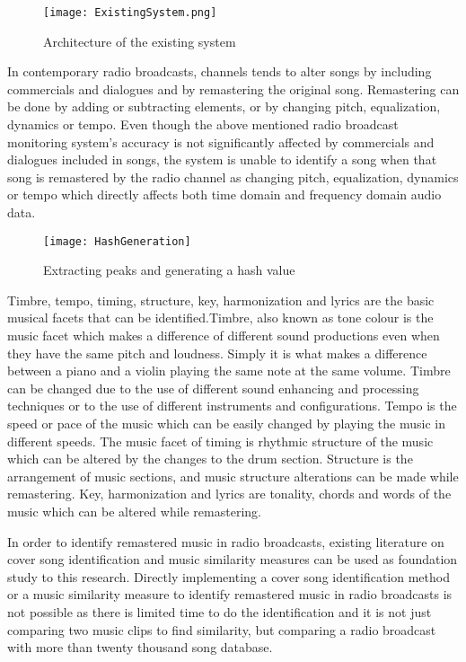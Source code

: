 \vspace{12pt}

\begin{figure}[H]
    \centering
    \texttt{[image: ExistingSystem.png]}
    \caption{Architecture of the existing system}
    \label{fig:existing_system}
\end{figure}
\vspace{12pt}

In contemporary radio broadcasts, channels tends to alter songs by including commercials and dialogues and by remastering 
the original song. Remastering can be done by adding or subtracting elements, or by changing pitch, equalization, dynamics or 
tempo\cite{SerraBook}. Even though the above mentioned radio broadcast monitoring system's accuracy is not significantly 
affected by commercials and dialogues included in songs, the system is unable to identify a song when that song is remastered 
by the radio channel as changing pitch, equalization, dynamics or tempo which directly affects both time domain and 
frequency domain audio data.

\vspace{12pt}

\begin{figure}[H]
    \centering
    \texttt{[image: HashGeneration]}
    \caption{Extracting peaks and generating a hash value\cite{Nishan}}
    \label{fig:fingerprint}
\end{figure}

\vspace{12pt}
\clearpage

Timbre, tempo, timing, structure, key, harmonization and lyrics are the basic musical facets that can be 
identified\cite{SerraBook}.Timbre, also known as tone colour is the music facet which makes a difference of different 
sound productions even when they have the same pitch and loudness. Simply it is what makes a difference between a piano 
and a violin playing the same note at the same volume. Timbre can be changed due to the use of different sound enhancing 
and processing techniques or to the use of different instruments and configurations. Tempo is the speed or pace of the 
music which can be easily changed by playing the music in different speeds. The music facet of timing is rhythmic structure 
of the music which can be altered by the changes to the drum section. Structure is the arrangement of music sections, and
music structure alterations can be made while remastering. Key, harmonization and lyrics are 
tonality, chords and words of the music which can be altered while remastering.
\vspace{12pt}

In order to identify remastered music in radio broadcasts,
existing literature on cover song identification and music similarity measures can be used as foundation study to this 
research. Directly implementing a cover song identification method or a music similarity measure to identify remastered 
music in radio broadcasts is not possible as there is limited time to do the identification and it is not just 
comparing two music clips to find similarity, but comparing a radio broadcast with more than twenty thousand song database.